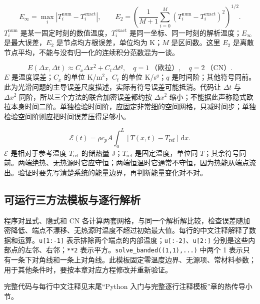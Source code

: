 \begin{equation}
E_\infty=\max_i|T_i^{\mathrm{num}}-T_i^{\mathrm{exact}}|,\qquad
E_2=\left(\frac{1}{M+1}\sum_{i=0}^M(T_i^{\mathrm{num}}-T_i^{\mathrm{exact}})^2\right)^{1/2}.
\end{equation}
$T_i^{\mathrm{num}}$ 是某一固定时刻的数值温度，$T_i^{\mathrm{exact}}$ 是同一坐标、同一时刻的解析温度；$E_\infty$ 是最大误差，$E_2$ 是节点均方根误差，单位均为 K；$M$ 是区间数。这里 $E_2$ 是离散节点平均，不能与没有归一化的连续积分范数混为一谈。

\begin{equation}
E(\Delta x,\Delta t)\approx C_x\Delta x^2+C_t\Delta t^q,
\quad q=1\ \text{（欧拉）},\quad q=2\ \text{（CN）}.
\end{equation}
$E$ 是温度误差；$C_x$ 的单位 K/m$^2$，$C_t$ 的单位 K/s$^q$；$q$ 是时间阶；其他符号同前。此为光滑问题的主导误差尺度描述，实际有符号误差可能抵消。代码让 $\Delta t$ 与 $\Delta x^2$ 同阶，所以三个方法的联合加密误差都约按 $\Delta x^2$ 缩小；不能据此声称隐式欧拉本身时间二阶。单独检验时间阶，应固定非常细的空间网格，只减时间步；单独检验空间阶则应把时间误差压得足够小。

\begin{equation}
\mathcal E(t)=\rho c_pA\int_0^L[T(x,t)-T_{\mathrm{ref}}]\,\mathrm dx.
\end{equation}
$\mathcal E$ 是相对于参考温度 $T_{\mathrm{ref}}$ 的储热量 J；$T_{\mathrm{ref}}$ 是固定温度，单位同 $T$；其余符号同前。两端绝热、无热源时它应守恒；两端恒温时它通常不守恒，因为热能从端点流出。验证时要先写清楚系统的能量边界，再判断能量变化对不对。

\subsection{可运行三方法模板与逐行解析}
程序对显式、隐式和 CN 各计算两套网格，与同一个解析解比较，检查误差随加密降低、端点不漂移、无热源时温度不超过初始最大值。每行的中文注释解释了数据和运算。\texttt{u[1:-1]} 表示排除两个端点的内部温度；\texttt{u[:-2]}、\texttt{u[2:]} 分别是这些内部点的左邻、右邻；\texttt{**2} 表示平方。\texttt{solve\_banded((1,1),...)} 中两个 1 表示只有一条下对角线和一条上对角线。此模板固定零温度边界、无源项、常材料参数；用于其他条件时，要按本章对应方程修改并重新验证。

完整代码与每行中文注释见末尾“Python 入门与完整逐行注释模板”章的热传导小节。

